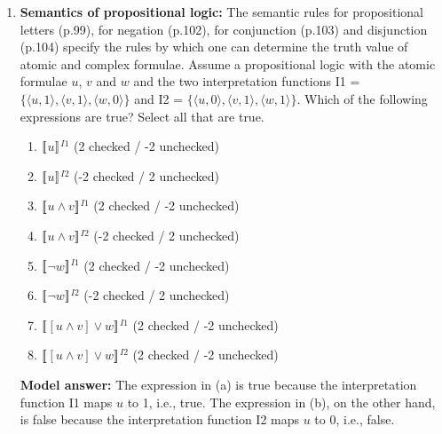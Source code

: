 \documentclass[a4,11pt]{article}
\newcommand{\6}{\mbox{$[\hspace*{-.6mm}[$}}
\newcommand{\9}{\mbox{$]\hspace*{-.6mm}]$}}
\newcommand{\sem}[2]{\6#1\9$^{#2}$}
\begin{document}
\begin{enumerate}[leftmargin = 12pt]
(j) is not well-formed because the negation applies not to a well-formed formula but rather to $\vee w$, which is not a formula, and therefore cannot serve as the argument for negation.


\item {\bf Semantics of propositional logic:} The semantic rules for propositional letters (p.99), for negation (p.102), for conjunction (p.103) and disjunction (p.104) specify the rules by which one can determine the truth value of atomic and complex formulae. Assume a propositional logic with the atomic formulae $u$, $v$ and $w$ and the two interpretation functions I1 = $\{\langle u, 1\rangle, \langle v, 1\rangle, \langle w, 0\rangle\}$ and I2 = $\{\langle u, 0\rangle, \langle v, 1\rangle, \langle w, 1\rangle\}$. Which of the following expressions are true? Select all that are true.


\begin{enumerate}[noitemsep]
\item \sem{$u$}{I1} \hspace*{2cm} (2 checked / -2 unchecked)

\item \sem{$u$}{I2} \hspace*{2cm} (-2 checked / 2 unchecked)


\item \sem{$u \wedge v$}{I1} \hspace*{2cm} (2 checked / -2 unchecked)

\item \sem{$u \wedge v$}{I2} \hspace*{2cm} (-2 checked / 2 unchecked)


\item \sem{$\neg w$}{I1} \hspace*{2cm} (2 checked / -2 unchecked)

\item \sem{$\neg w$}{I2} \hspace*{2cm} (-2 checked / 2 unchecked)


\item \sem{$[u \wedge v] \vee w$}{I1} \hspace*{2cm} (2 checked / -2 unchecked)

\item \sem{$[u \wedge v] \vee w$}{I2} \hspace*{2cm} (2 checked / -2 unchecked)

\end{enumerate}

{\bf Model answer:} The expression in (a) is true because the interpretation function I1 maps $u$ to 1, i.e., true. The expression in (b), on the other hand, is false because the interpretation function I2 maps $u$ to 0, i.e., false.


\end{enumerate}
\end{document}

